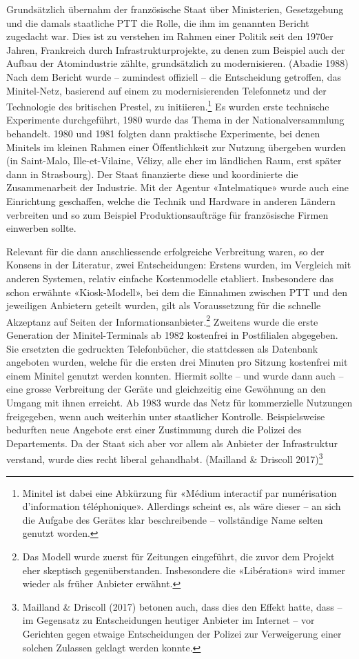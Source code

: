 \documentclass[a4paper,
fontsize=11pt,
oneside,
numbers=noperiodatend,
parskip=half-,
bibliography=totoc,
final
]{scrartcl}
\begin{document}
Grundsätzlich übernahm der französische Staat über Ministerien,
Gesetzgebung und die damals staatliche PTT die Rolle, die ihm im
genannten Bericht zugedacht war. Dies ist zu verstehen im Rahmen einer
Politik seit den 1970er Jahren, Frankreich durch Infrastrukturprojekte,
zu denen zum Beispiel auch der Aufbau der Atomindustrie zählte,
grundsätzlich zu modernisieren. (Abadie 1988) Nach dem Bericht wurde --
zumindest offiziell -- die Entscheidung getroffen, das Minitel-Netz,
basierend auf einem zu modernisierenden Telefonnetz und der Technologie
des britischen Prestel, zu initiieren.\footnote{Minitel ist dabei eine
  Abkürzung für «Médium interactif par numérisation d'information
  téléphonique». Allerdings scheint es, als wäre dieser -- an sich die
  Aufgabe des Gerätes klar beschreibende -- vollständige Name selten
  genutzt worden.} Es wurden erste technische Experimente durchgeführt,
1980 wurde das Thema in der Nationalversammlung behandelt. 1980 und 1981
folgten dann praktische Experimente, bei denen Minitels im kleinen
Rahmen einer Öffentlichkeit zur Nutzung übergeben wurden (in Saint-Malo,
Ille-et-Vilaine, Vélizy, alle eher im ländlichen Raum, erst später dann
in Strasbourg). Der Staat finanzierte diese und koordinierte die
Zusammenarbeit der Industrie. Mit der Agentur «Intelmatique» wurde auch
eine Einrichtung geschaffen, welche die Technik und Hardware in anderen
Ländern verbreiten und so zum Beispiel Produktionsaufträge für
französische Firmen einwerben sollte.

Relevant für die dann anschliessende erfolgreiche Verbreitung waren, so
der Konsens in der Literatur, zwei Entscheidungen: Erstens wurden, im
Vergleich mit anderen Systemen, relativ einfache Kostenmodelle
etabliert. Insbesondere das schon erwähnte «Kiosk-Modell», bei dem die
Einnahmen zwischen PTT und den jeweiligen Anbietern geteilt wurden, gilt
als Voraussetzung für die schnelle Akzeptanz auf Seiten der
Informationsanbieter.\footnote{Das Modell wurde zuerst für Zeitungen
  eingeführt, die zuvor dem Projekt eher skeptisch gegenüberstanden.
  Insbesondere die «Libération» wird immer wieder als früher Anbieter
  erwähnt.} Zweitens wurde die erste Generation der Minitel-Terminals ab
1982 kostenfrei in Postfilialen abgegeben. Sie ersetzten die gedruckten
Telefonbücher, die stattdessen als Datenbank angeboten wurden, welche
für die ersten drei Minuten pro Sitzung kostenfrei mit einem Minitel
genutzt werden konnten. Hiermit sollte -- und wurde dann auch -- eine
grosse Verbreitung der Geräte und gleichzeitig eine Gewöhnung an den
Umgang mit ihnen erreicht. Ab 1983 wurde das Netz für kommerzielle
Nutzungen freigegeben, wenn auch weiterhin unter staatlicher Kontrolle.
Beispielsweise bedurften neue Angebote erst einer Zustimmung durch die
Polizei des Departements. Da der Staat sich aber vor allem als Anbieter
der Infrastruktur verstand, wurde dies recht liberal gehandhabt.
(Mailland \& Driscoll 2017)\footnote{Mailland \& Driscoll (2017) betonen
  auch, dass dies den Effekt hatte, dass -- im Gegensatz zu
  Entscheidungen heutiger Anbieter im Internet -- vor Gerichten gegen
  etwaige Entscheidungen der Polizei zur Verweigerung einer solchen
  Zulassen geklagt werden konnte.}
\end{document}
